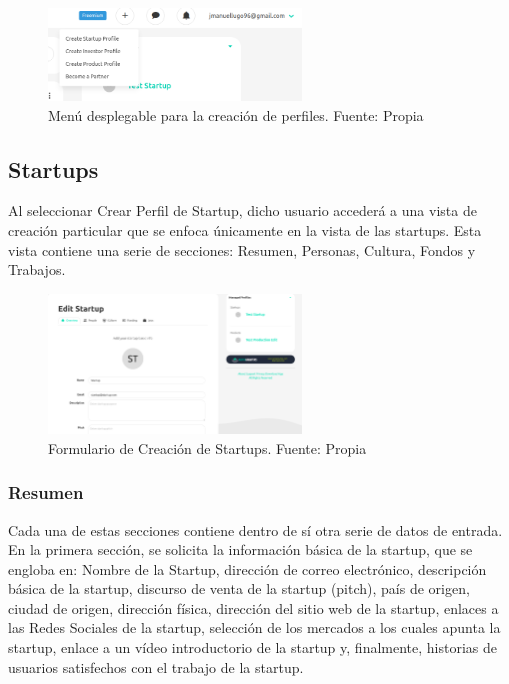\begin{figure}[H]
\centering
\includegraphics[width=0.60\textwidth]{img/36.png}
\caption{Menú desplegable para la creación de perfiles. Fuente: Propia}
\label{figure:dropdownProfiles}
\end{figure}


\subsection{Startups}	

Al seleccionar Crear Perfil de Startup, dicho usuario accederá a una vista de creación particular que se enfoca únicamente en la vista de las startups. Esta vista contiene una serie de secciones: Resumen, Personas, Cultura, Fondos y Trabajos.

\begin{figure}[H]
\centering
\includegraphics[width=0.60\textwidth]{img/37.png}
\caption{Formulario de Creación de Startups. Fuente: Propia}
\label{figure:startupsCreation}
\end{figure}

\subsubsection{Resumen}

Cada una de estas secciones contiene dentro de sí otra serie de datos de entrada. En la primera sección, se solicita la información básica de la startup, que se engloba en: Nombre de la Startup, dirección de correo electrónico, descripción básica de la startup, discurso de venta de la startup (pitch), país de origen, ciudad de origen, dirección física, dirección del sitio web de la startup, enlaces a las Redes Sociales de la startup, selección de los mercados a los cuales apunta la startup, enlace a un vídeo introductorio de la startup y, finalmente, historias de usuarios satisfechos con el trabajo de la startup.

